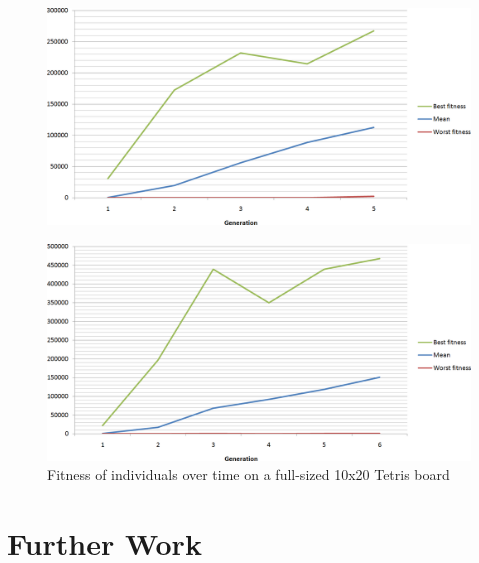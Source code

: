 \documentclass[a4paper,12pt]{article}
\begin{document}
\begin{figure}[h]
  \centering
  \includegraphics[width=\graphwidth]{results/10x20-results1.png}
\end{figure}

\begin{figure}[h]
  \centering
  \includegraphics[width=\graphwidth]{results/10x20-results2.png}
  \caption{Fitness of individuals over time on a full-sized 10x20 Tetris board}
  \label{Large}
\end{figure}

\section{Further Work}


\end{document}

